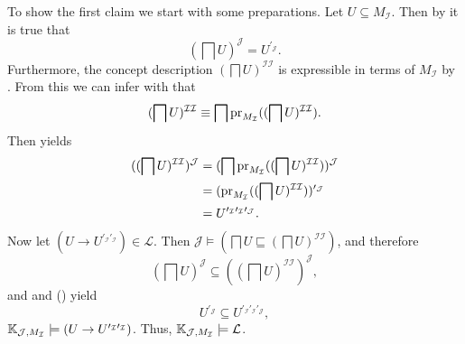 \begin{Proof}
  To show the first claim we start with some preparations.  Let $U \subseteq
  M_{\mathcal{I}}$.  Then by  it is true that
  \begin{equation}
    \label{eq:29}
    (\bigsqcap U)^{\mathcal{J}} = U^{\prime_{\mathcal{J}}}.
  \end{equation}
  Furthermore, the concept description $(\bigsqcap U)^{\mathcal{I}\mathcal{I}}$ is
  expressible in terms of $M_{\mathcal{I}}$ by
  .  From this we can infer with
   that
  \begin{equation*}
    (\bigsqcap U)^{\mathcal{I}\mathcal{I}} \equiv \bigsqcap
    \operatorname{pr}_{M_{\mathcal{I}}}((\bigsqcap U)^{\mathcal{I}\mathcal{I}}).
  \end{equation*}
  Then  yields
  \begin{equation}
    \label{eq:30}
    \begin{aligned}
      ((\bigsqcap U)^{\mathcal{I}\mathcal{I}})^{\mathcal{J}}
      &= (\bigsqcap \operatorname{pr}_{M_{\mathcal{I}}}((\bigsqcap
      U)^{\mathcal{I}\mathcal{I}}))^{\mathcal{J}} \\
      &= (\operatorname{pr}_{M_{\mathcal{I}}}((\bigsqcap
      U)^{\mathcal{I}\mathcal{I}}))^{\prime_{\mathcal{J}}} \\
      &= U^{\prime_{\mathcal{I}}\prime_{\mathcal{I}}\prime_{\mathcal{J}}}.
    \end{aligned}
  \end{equation}
  Now let $(U \to U^{\prime_{\mathcal{I}}\prime_{\mathcal{I}}}) \in \mathcal{L}$.  Then
  $\mathcal{J} \models (\bigsqcap U \sqsubseteq (\bigsqcap U)^{\mathcal{I}\mathcal{I}})$,
  and therefore
  \begin{equation*}
    (\bigsqcap U)^{\mathcal{J}} \subseteq ((\bigsqcap U)^{\mathcal{I}\mathcal{I}})^{\mathcal{J}},
  \end{equation*}
  and  and () yield
  \begin{equation*}
    U^{\prime_{\mathcal{J}}} \subseteq U^{\prime_{\mathcal{I}}\prime_{\mathcal{I}}\prime_{\mathcal{J}}},
  \end{equation*}
  \ie ${\mathbb{K}}_{\mathcal{J}, M_{\mathcal{I}}} \models (U \to
  U^{\prime_{\mathcal{I}}\prime_{\mathcal{I}}})$.  Thus, ${\mathbb{K}}_{\mathcal{J},
    M_{\mathcal{I}}} \models \mathcal{L}$.


\end{Proof}
